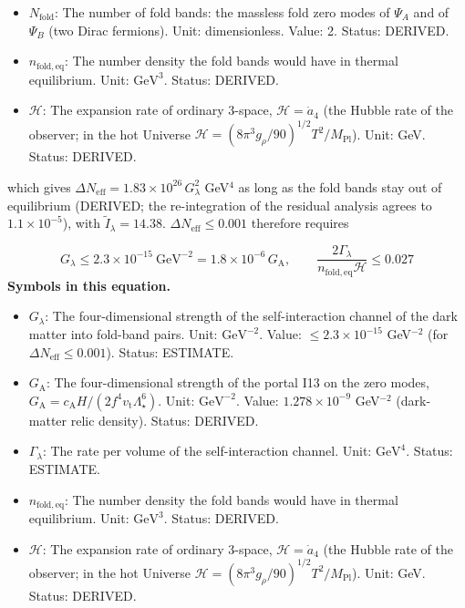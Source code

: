 \documentclass[
  10pt,
]{article}
\providecommand{\tightlist}{%
  \setlength{\itemsep}{0pt}\setlength{\parskip}{0pt}}
\begin{document}
\begin{itemize}
  \(v_{\mathrm{rel}}\): The relative velocity of the two annihilating
  particles; \(\langle\sigma v_{\mathrm{rel}}\rangle\) the thermal
  average. Unit: dimensionless (c = 1). Status: STANDARD.
\item
  \(N_{\mathrm{fold}}\): The number of fold bands: the massless fold
  zero modes of \(\Psi_A\) and of \(\Psi_B\) (two Dirac fermions). Unit:
  dimensionless. Value: 2. Status: DERIVED.
\item
  \(n_{\mathrm{fold,eq}}\): The number density the fold bands would have
  in thermal equilibrium. Unit: \(\mathrm{GeV}^{3}\). Status: DERIVED.
\item
  \(\mathcal{H}\): The expansion rate of ordinary 3-space,
  \(\mathcal{H} = \dot a_4\) (the Hubble rate of the observer; in the
  hot Universe
  \(\mathcal{H} = (8\pi^3g_\rho/90)^{1/2}T^2/M_{\mathrm{Pl}}\)). Unit:
  GeV. Status: DERIVED.
\end{itemize}

which gives \(\Delta N_{\mathrm{eff}} = 1.83\times10^{26}\,G_\lambda^2\)
GeV\(^4\) as long as the fold bands stay out of equilibrium (DERIVED;
the re-integration of the residual analysis agrees to
\(1.1\times10^{-5}\)), with \(\tilde I_\lambda = 14.38\).
\(\Delta N_{\mathrm{eff}} \le 0.001\) therefore requires

\[ G_\lambda \le 2.3\times10^{-15}\ \text{GeV}^{-2} = 1.8\times10^{-6}\,G_{\mathrm{A}},\qquad \frac{2\Gamma_\lambda}{n_{\mathrm{fold,eq}}\mathcal{H}} \le 0.027 \]
\textbf{Symbols in this equation.}

\begin{itemize}
\tightlist
\item
  \(G_\lambda\): The four-dimensional strength of the self-interaction
  channel of the dark matter into fold-band pairs. Unit:
  \(\mathrm{GeV}^{-2}\). Value: \(\le 2.3\times10^{-15}\) GeV\(^{-2}\)
  (for \(\Delta N_{\mathrm{eff}} \le 0.001\)). Status: ESTIMATE.
\item
  \(G_{\mathrm{A}}\): The four-dimensional strength of the portal I13 on
  the zero modes,
  \(G_{\mathrm{A}} = c_{\mathrm{A}}H/(2f^4v_{\mathrm{t}}\Lambda_\star^6)\).
  Unit: \(\mathrm{GeV}^{-2}\). Value: \(1.278\times10^{-9}\)
  GeV\(^{-2}\) (dark-matter relic density). Status: DERIVED.
\item
  \(\Gamma_\lambda\): The rate per volume of the self-interaction
  channel. Unit: \(\mathrm{GeV}^{4}\). Status: ESTIMATE.
\item
  \(n_{\mathrm{fold,eq}}\): The number density the fold bands would have
  in thermal equilibrium. Unit: \(\mathrm{GeV}^{3}\). Status: DERIVED.
\item
  \(\mathcal{H}\): The expansion rate of ordinary 3-space,
  \(\mathcal{H} = \dot a_4\) (the Hubble rate of the observer; in the
  hot Universe
  \(\mathcal{H} = (8\pi^3g_\rho/90)^{1/2}T^2/M_{\mathrm{Pl}}\)). Unit:
  GeV. Status: DERIVED.
\end{itemize}
\end{document}

